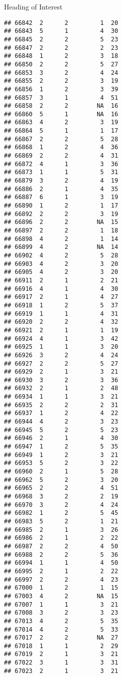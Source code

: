 \documentclass[
  ignorenonframetext,
]{beamer}
\begin{document}
\begin{frame}[fragile]{Heading of Interest}
\begin{verbatim}
## 66842  2      2         1  20
## 66843  5      1         4  30
## 66845  2      2         5  23
## 66847  2      2         2  23
## 66848  1      2         3  18
## 66850  2      2         5  27
## 66853  3      2         4  24
## 66855  2      2         3  19
## 66856  1      2         3  39
## 66857  3      1         4  51
## 66858  2      2        NA  16
## 66860  5      1        NA  16
## 66863  4      2         3  19
## 66864  5      1         1  17
## 66867  2      2         5  28
## 66868  1      2         4  36
## 66869  2      2         4  31
## 66872  4      1         3  36
## 66873  1      1         5  31
## 66879  3      2         4  19
## 66886  2      1         4  35
## 66887  6      1         3  19
## 66890  1      2         1  17
## 66892  2      2         3  19
## 66896  2      2        NA  15
## 66897  2      2         1  18
## 66898  4      2         1  14
## 66899  4      2        NA  14
## 66902  4      2         5  28
## 66903  4      2         3  20
## 66905  4      2         3  20
## 66911  2      1         2  21
## 66916  4      1         4  30
## 66917  2      1         4  27
## 66918  1      2         5  37
## 66919  1      1         4  31
## 66920  2      2         4  32
## 66921  2      1         1  19
## 66924  4      1         3  42
## 66925  1      1         3  20
## 66926  3      2         4  24
## 66927  2      2         5  27
## 66929  2      1         3  21
## 66930  3      2         3  36
## 66932  2      1         2  48
## 66934  1      1         3  21
## 66935  2      2         2  31
## 66937  1      2         4  22
## 66944  4      2         3  23
## 66945  5      2         5  23
## 66946  2      1         4  30
## 66947  1      2         5  35
## 66949  1      2         3  21
## 66953  5      2         3  22
## 66960  2      1         5  28
## 66962  5      2         3  20
## 66965  2      2         4  51
## 66968  3      2         2  19
## 66970  3      2         4  24
## 66982  1      2         5  45
## 66983  5      2         1  21
## 66985  2      1         3  26
## 66986  2      1         2  22
## 66987  2      2         4  50
## 66988  2      2         5  36
## 66994  1      1         4  50
## 66995  2      1         2  22
## 66997  2      2         4  23
## 67000  1      2         1  15
## 67003  4      2        NA  15
## 67007  1      1         3  21
## 67008  3      2         3  23
## 67013  4      2         5  35
## 67014  4      2         5  33
## 67017  2      2        NA  27
## 67018  1      1         2  29
## 67019  2      1         3  21
## 67022  3      1         3  31
## 67023  2      1         3  21

\end{verbatim}
\end{frame}
\end{document}
